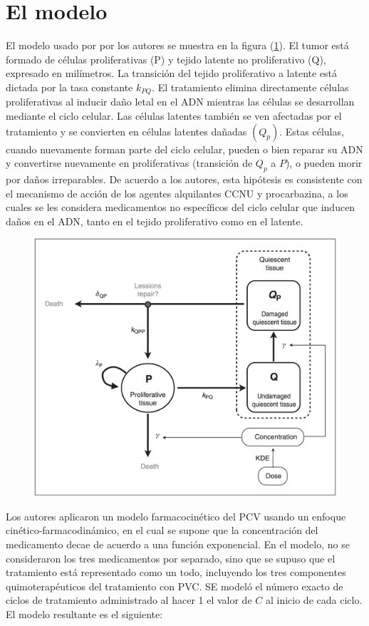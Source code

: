\documentclass[letterpaper,12pt]{article}
\theoremstyle{definition} \newtheorem{Def}{Definición}[section]
\theoremstyle{definition} \newtheorem{Teo}{Teorema}[section]
\theoremstyle{definition} \newtheorem{Pro}{Proposición}
\theoremstyle{definition} \newtheorem{Lema}{Lema}[section]
\theoremstyle{definition} \newtheorem{Cor}{Corolario}[section]
\begin{document}
\section{El modelo}
El modelo usado por por los autores se muestra en la figura (\ref{modelo}). El tumor está formado de células proliferativas (P) y tejido latente no proliferativo  (Q), expresado en milímetros. La transición del tejido proliferativo a latente está dictada por la tasa constante $k_{PQ}$. El tratamiento elimina directamente células proliferativas al inducir daño letal en el ADN mientras las células se desarrollan mediante el ciclo celular. Las células latentes también se ven afectadas por el tratamiento y se convierten en células latentes dañadas $(Q_p)$. Estas células, cuando nuevamente forman parte del ciclo celular, pueden o bien reparar su ADN y convertirse nuevamente en proliferativas (transición de $Q_p$ a $P$), o pueden morir por daños irreparables. De acuerdo a los autores, esta hipótesis es consistente con el mecanismo de acción de los agentes alquilantes CCNU y procarbazina, a los cuales se les considera medicamentos no específicos del ciclo celular que inducen daños en el ADN, tanto en el tejido proliferativo como en el latente. 

\begin{figure}[h]
	\centering
	\includegraphics[angle=0,width=.8\textwidth]{modelo.png}
	\caption{\label{modelo}}
\end{figure}

Los autores aplicaron un modelo farmacocinético del PCV usando un enfoque cinético-farmacodinámico, en el cual se supone que la concentración del medicamento decae de acuerdo a una función exponencial. En el modelo, no se consideraron los tres medicamentos por separado, sino que se supuso que el tratamiento está representado como un todo, incluyendo los tres componentes quimoterapéuticos del tratamiento con PVC. SE modeló el número exacto de ciclos de tratamiento administrado al hacer 1 el valor de $C$ al inicio de cada ciclo. El modelo resultante es el siguiente:
\end{document}
